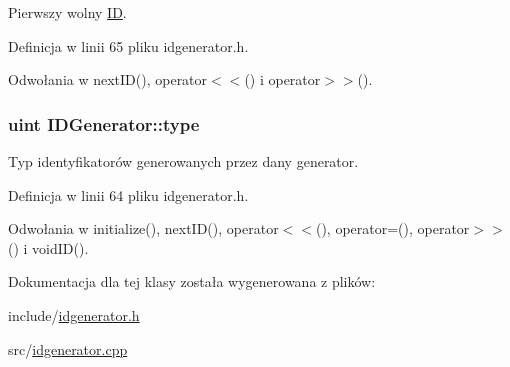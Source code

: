 Pierwszy wolny \hyperlink{classIDGenerator_1_1ID}{ID}. 



Definicja w linii 65 pliku idgenerator.h.



Odwołania w nextID(), operator$<$$<$() i operator$>$$>$().

\hypertarget{classIDGenerator_abe469295c859bc2edc533a190ae2e1d9}{
\subsubsection[{type}]{\setlength{\rightskip}{0pt plus 5cm}uint {\bf IDGenerator::type}}}
\label{classIDGenerator_abe469295c859bc2edc533a190ae2e1d9}


Typ identyfikatorów generowanych przez dany generator. 



Definicja w linii 64 pliku idgenerator.h.



Odwołania w initialize(), nextID(), operator$<$$<$(), operator=(), operator$>$$>$() i voidID().



Dokumentacja dla tej klasy została wygenerowana z plików:\begin{DoxyCompactItemize}
\item 
include/\hyperlink{idgenerator_8h}{idgenerator.h}\item 
src/\hyperlink{idgenerator_8cpp}{idgenerator.cpp}\end{DoxyCompactItemize}
